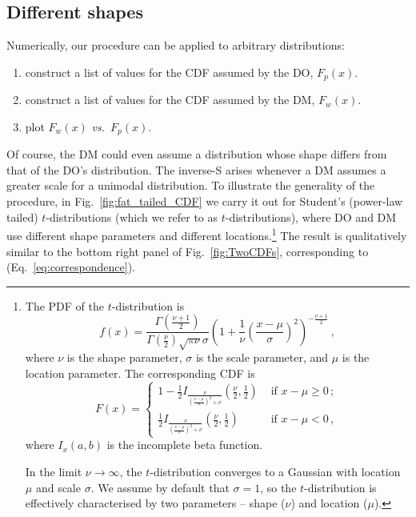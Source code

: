 \documentclass[a4paper, 12pt]{article}
\newcommand{\eref}[1]{(Eq.~\ref{eq:#1})}
\newcommand{\fref}[1]{Fig.~\ref{fig:#1}}
\newcommand{\seclabel}[1]{\label{sec:#1}}
\newcommand{\vs}{{\it vs.}\ }
\newcommand{\be}{\begin{equation}}
\newcommand{\ee}{\end{equation}}
\begin{document}
\subsection{Different shapes\seclabel{Different_shapes}}
Numerically, our procedure can be applied to arbitrary distributions: 
\begin{enumerate}
\item
construct a list of values for the CDF assumed by the DO, $F_p(x)$.
\item
construct a list of values for the CDF assumed by the DM, $F_w(x)$.
\item
plot $F_w(x)$ \vs $F_p(x)$.
\end{enumerate}
Of course, the DM could even assume a distribution whose shape differs from that of the DO's distribution. 
The inverse-S arises whenever a DM assumes a greater scale for a unimodal distribution. 
To illustrate the generality of the procedure, in \fref{fat_tailed_CDF} we carry it out for Student's (power-law tailed) $t$-distributions (which we refer to as $t$-distributions), where DO and DM use different shape parameters and different locations.\footnote{The PDF of the $t$-distribution is
%
\be
f\left(x\right) = \frac{\Gamma\left(\frac{\nu+1}{2}\right)} {\Gamma\left(\frac{\nu}{2}\right)\sqrt{\pi\nu}\sigma} \left(1+\frac{1}{\nu}\left(\frac{x-\mu}{\sigma}\right)^2 \right)^{-\frac{\nu+1}{2}}\,,
\ee
%
where $\nu$ is the shape parameter, $\sigma$ is the scale parameter, and $\mu$ is the location parameter. The corresponding CDF is
%
\be
F\left(x\right) = 
\begin{cases}
1 - \frac{1}{2} I_{\frac{\nu}{\left(\frac{x-\mu}{\sigma}\right)^2 + \nu}}\left(\frac{\nu}{2},\frac{1}{2}\right) &\text{ if } x-\mu \geq 0\,;\\
\frac{1}{2} I_{\frac{\nu}{\left(\frac{x-\mu}{\sigma}\right)^2 + \nu}}\left(\frac{\nu}{2},\frac{1}{2}\right) &\text{ if } x-\mu < 0\,,
\end{cases}
\ee
%
where $I_x\left(a,b\right)$ is the incomplete beta function.

In the limit $\nu \rightarrow \infty$, the $t$-distribution converges to a Gaussian with location $\mu$ and scale $\sigma$. We assume by default that $\sigma = 1$, so the $t$-distribution is effectively characterised by two parameters -- shape ($\nu$) and location ($\mu$).
}
The result is qualitatively similar to the bottom right panel of \fref{TwoCDFs}, corresponding to \eref{correspondence}. 
\end{document}
